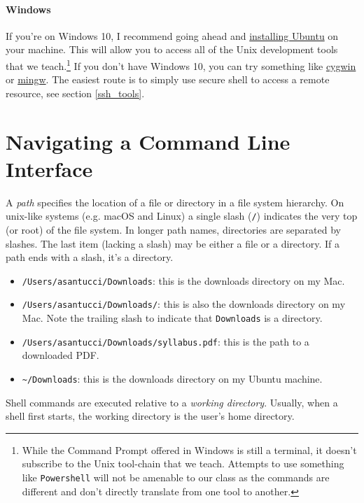 \documentclass[12pt,letterpaper,twoside]{article}
\begin{document}
\paragraph{Windows}
If you're on Windows 10, I recommend going ahead and 
\href{https://www.microsoft.com/en-us/p/ubuntu/9nblggh4msv6?activetab=pivot:overviewtab}
{installing Ubuntu} on your machine. This will allow you to access all of the Unix 
development tools that we teach.\footnote{While the Command Prompt offered in Windows is still a terminal, it doesn't subscribe to the Unix tool-chain that we teach. Attempts to use something like \texttt{Powershell} will not be amenable to our class as the commands are different and don't directly translate from one tool to another.} If you don't have Windows 10, you can try something like 
\href{https://www.cygwin.com/}{cygwin} or \href{http://www.mingw.org/}{mingw}. The easiest route is to simply use secure shell to access a remote resource, see section \ref{ssh_tools}.
\vspace{-8pt}
\section{Navigating a Command Line Interface}
A \emph{path} specifies the location of a file or directory in a file system
hierarchy.  On unix-like systems (e.g. macOS and Linux) a single slash 
(\texttt{/})
indicates the very top (or root) of the file system.  In longer path names,
directories are separated by slashes.  The last item (lacking a slash) may be
either a file or a directory.  If a path ends with a slash, it's a
directory.
\begin{itemize}
 \item \texttt{/Users/asantucci/Downloads}: this is the downloads directory on my Mac.
 \item \texttt{/Users/asantucci/Downloads/}: this is also the downloads directory on my Mac.  Note
  the trailing slash to indicate that \texttt{Downloads} is a directory.
 \item \texttt{/Users/asantucci/Downloads/syllabus.pdf}: this is the path to a downloaded PDF.
 \item \texttt{\textasciitilde/Downloads}: this is the downloads directory on my Ubuntu machine.
\end{itemize}


Shell commands are executed relative to a \emph{working directory}.  Usually, when
a shell first starts, the working directory is the user's home directory.
\end{document}
